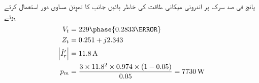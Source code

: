پانچ فی صد سرک پر اندرونی میکانی طاقت کی خاطر بائیں جانب کا تھوِنن مساوی دور استعمال کرتے ہوئے 
\begin{align*}
V_t&=229 \phase{0.2833 \degree}\\
Z_t&=0.251+j2.343\\
\abs{\hat{I}_r'}&=\SI{11.8}{\ampere}\\
p_m&=\frac{3 \times 11.8^2 \times 0.974 \times (1-0.05)}{0.05}=\SI{7730}{\watt}
\end{align*}
